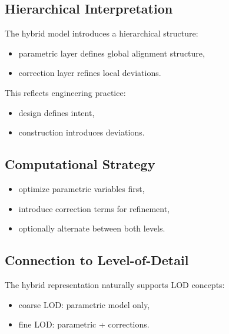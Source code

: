 \subsection{Hierarchical Interpretation}

\begin{remark}
The hybrid model introduces a hierarchical structure:
\begin{itemize}
\item parametric layer defines global alignment structure,
\item correction layer refines local deviations.
\end{itemize}
\end{remark}

\begin{remark}
This reflects engineering practice:
\begin{itemize}
\item design defines intent,
\item construction introduces deviations.
\end{itemize}
\end{remark}

\subsection{Computational Strategy}

\begin{itemize}
\item optimize parametric variables first,
\item introduce correction terms for refinement,
\item optionally alternate between both levels.
\end{itemize}

\subsection{Connection to Level-of-Detail}

\begin{remark}
The hybrid representation naturally supports LOD concepts:
\begin{itemize}
\item coarse LOD: parametric model only,
\item fine LOD: parametric + corrections.
\end{itemize}
\end{remark}

